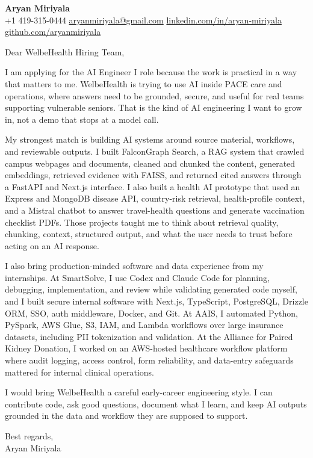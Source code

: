 \documentclass[letterpaper,11pt]{article}
\begin{document}
\begin{center}
    {\Large \textbf{Aryan Miriyala}}\\
    \vspace{2pt}
    +1 419-315-0444 \textbar{} \href{mailto:aryanmiriyala@gmail.com}{aryanmiriyala@gmail.com} \textbar{} \href{https://www.linkedin.com/in/aryan-miriyala-7788a21b6/}{linkedin.com/in/aryan-miriyala} \textbar{} \href{https://github.com/aryanmiriyala}{github.com/aryanmiriyala}
\end{center}

\vspace{10pt}

Dear WelbeHealth Hiring Team,

I am applying for the AI Engineer I role because the work is practical in a way that matters to me. WelbeHealth is trying to use AI inside PACE care and operations, where answers need to be grounded, secure, and useful for real teams supporting vulnerable seniors. That is the kind of AI engineering I want to grow in, not a demo that stops at a model call.

My strongest match is building AI systems around source material, workflows, and reviewable outputs. I built FalconGraph Search, a RAG system that crawled campus webpages and documents, cleaned and chunked the content, generated embeddings, retrieved evidence with FAISS, and returned cited answers through a FastAPI and Next.js interface. I also built a health AI prototype that used an Express and MongoDB disease API, country-risk retrieval, health-profile context, and a Mistral chatbot to answer travel-health questions and generate vaccination checklist PDFs. Those projects taught me to think about retrieval quality, chunking, context, structured output, and what the user needs to trust before acting on an AI response.

I also bring production-minded software and data experience from my internships. At SmartSolve, I use Codex and Claude Code for planning, debugging, implementation, and review while validating generated code myself, and I built secure internal software with Next.js, TypeScript, PostgreSQL, Drizzle ORM, SSO, auth middleware, Docker, and Git. At AAIS, I automated Python, PySpark, AWS Glue, S3, IAM, and Lambda workflows over large insurance datasets, including PII tokenization and validation. At the Alliance for Paired Kidney Donation, I worked on an AWS-hosted healthcare workflow platform where audit logging, access control, form reliability, and data-entry safeguards mattered for internal clinical operations.

I would bring WelbeHealth a careful early-career engineering style. I can contribute code, ask good questions, document what I learn, and keep AI outputs grounded in the data and workflow they are supposed to support.

\vspace{8pt}

Best regards,\\
Aryan Miriyala
\end{document}
